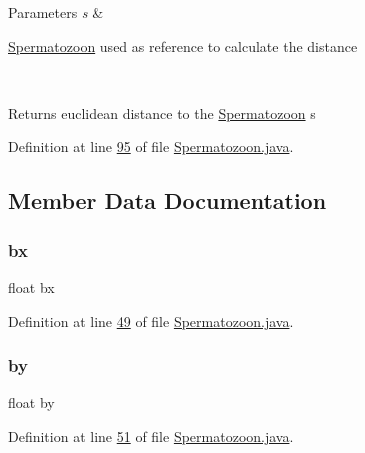 \begin{DoxyParams}{Parameters}
{\em s} & 
\begin{DoxyItemize}
\item \hyperlink{classdata_1_1_spermatozoon}{Spermatozoon} used as reference to calculate the distance 
\end{DoxyItemize}\\
\hline
\end{DoxyParams}
\begin{DoxyReturn}{Returns}
euclidean distance to the \hyperlink{classdata_1_1_spermatozoon}{Spermatozoon} s 
\end{DoxyReturn}


Definition at line \hyperlink{_spermatozoon_8java_source_l00095}{95} of file \hyperlink{_spermatozoon_8java_source}{Spermatozoon.\+java}.



\subsection{Member Data Documentation}
\hypertarget{classdata_1_1_spermatozoon_a5c25ae7634a79d11d6679b6b07c240a1}{}\label{classdata_1_1_spermatozoon_a5c25ae7634a79d11d6679b6b07c240a1} 
\subsubsection{\texorpdfstring{bx}{bx}}
{\footnotesize\ttfamily float bx}



Definition at line \hyperlink{_spermatozoon_8java_source_l00049}{49} of file \hyperlink{_spermatozoon_8java_source}{Spermatozoon.\+java}.

\hypertarget{classdata_1_1_spermatozoon_affce45e955f0a114a5569e019b8d8634}{}\label{classdata_1_1_spermatozoon_affce45e955f0a114a5569e019b8d8634} 
\subsubsection{\texorpdfstring{by}{by}}
{\footnotesize\ttfamily float by}



Definition at line \hyperlink{_spermatozoon_8java_source_l00051}{51} of file \hyperlink{_spermatozoon_8java_source}{Spermatozoon.\+java}.

